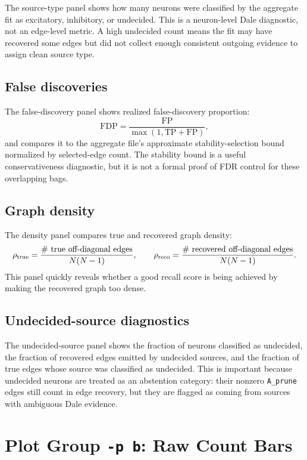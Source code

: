 \documentclass[11pt]{article}
\begin{document}
The source-type panel shows how many neurons were classified by the aggregate
fit as excitatory, inhibitory, or undecided. This is a neuron-level Dale
diagnostic, not an edge-level metric. A high undecided count means the fit
may have recovered some edges but did not collect enough consistent outgoing
evidence to assign clean source type.

\subsection{False discoveries}

The false-discovery panel shows realized false-discovery proportion:
\[
  \mathrm{FDP}=\frac{\mathrm{FP}}{\max(1,\mathrm{TP}+\mathrm{FP})},
\]
and compares it to the aggregate file's approximate stability-selection
bound normalized by selected-edge count. The stability bound is a useful
conservativeness diagnostic, but it is not a formal proof of FDR control for
these overlapping bags.

\subsection{Graph density}

The density panel compares true and recovered graph density:
\[
  \rho_{\mathrm{true}} =
  \frac{\#\hbox{ true off-diagonal edges}}{N(N-1)},\qquad
  \rho_{\mathrm{reco}} =
  \frac{\#\hbox{ recovered off-diagonal edges}}{N(N-1)} .
\]
This panel quickly reveals whether a good recall score is being achieved by
making the recovered graph too dense.

\subsection{Undecided-source diagnostics}

The undecided-source panel shows the fraction of neurons classified as
undecided, the fraction of recovered edges emitted by undecided sources, and
the fraction of true edges whose source was classified as undecided. This is
important because undecided neurons are treated as an abstention category:
their nonzero \texttt{A\_prune} edges still count in edge recovery, but they
are flagged as coming from sources with ambiguous Dale evidence.

\section{Plot Group \texttt{-p b}: Raw Count Bars}
\label{sec:plot-b}
\end{document}
